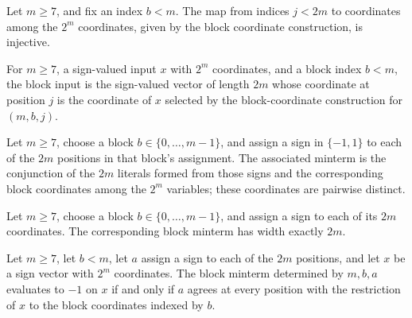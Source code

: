 \begin{theorem}
\label{FABL.blockCoordinate_injective}
\leanok
{}
Let $m\geq 7$, and fix an index $b<m$. The map from indices $j<2m$ to coordinates among
the $2^m$ coordinates, given by the block coordinate construction, is injective.
\end{theorem}

\begin{definition}
\label{FABL.blockInput}
\leanok
{}
For $m\ge 7$, a sign-valued input $x$ with $2^m$ coordinates, and a block index $b<m$,
the block input is the sign-valued vector of length $2m$ whose coordinate at position
$j$ is the coordinate of $x$ selected by the block-coordinate construction for
$(m,b,j)$.
\end{definition}

\begin{definition}
\label{FABL.blockMinterm}
\leanok
{}
Let $m\ge 7$, choose a block $b\in\{0,\ldots,m-1\}$, and assign a sign in $\{−1,1\}$ to
each of the $2m$ positions in that block's assignment. The associated minterm is the
conjunction of the $2m$ literals formed from those signs and the corresponding block
coordinates among the $2^m$ variables; these coordinates are pairwise distinct.
\end{definition}

\begin{theorem}
\label{FABL.width_blockMinterm}
\leanok
{}
Let $m\ge 7$, choose a block $b\in\{0,\ldots,m-1\}$, and assign a sign to each of its
$2m$ coordinates. The corresponding block minterm has width exactly $2m$.
\end{theorem}

\begin{theorem}
\label{FABL.blockMinterm_eval_eq_neg_one_iff}
\leanok
{}
Let $m\geq 7$, let $b<m$, let $a$ assign a sign to each of the $2m$ positions, and let
$x$ be a sign vector with $2^m$ coordinates. The block minterm determined by $m,b,a$
evaluates to $-1$ on $x$ if and only if $a$ agrees at every position with the
restriction of $x$ to the block coordinates indexed by $b$.
\end{theorem}

